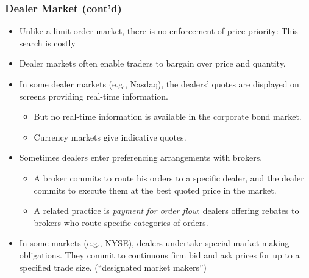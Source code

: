 \documentclass[10pt]{beamer}
\begin{document}
	
	
	\begin{frame}
		\frametitle{Dealer Market (cont'd)}
		
		\begin{itemize} 
			
			\item Unlike a limit order market, there is no enforcement of price priority: This search is costly
			\item Dealer markets often enable traders to bargain over price and quantity.
			\item In some dealer markets (e.g., Nasdaq), the dealers’ quotes are displayed on screens providing real-time information.
			\begin{itemize}
				\item But no real-time information is available in the corporate bond market.
				\item Currency markets give indicative quotes.
			\end{itemize}
			
			
			\item Sometimes dealers enter preferencing arrangements with brokers. 
			\begin{itemize}
				\item A broker commits to route his orders to a specific dealer, and the dealer commits to execute them at the best quoted price in the market.
				\item A related practice is \textit{payment for order flow}: dealers offering rebates to brokers who route specific categories of orders.
			\end{itemize}
			
			\item In some markets (e.g., NYSE), dealers undertake special market-making obligations. They commit to continuous firm bid and ask prices for up to a specified trade size. (``designated market makers'')
			
			
			
		\end{itemize}
		
	\end{frame}
	
	
	
\end{document}
